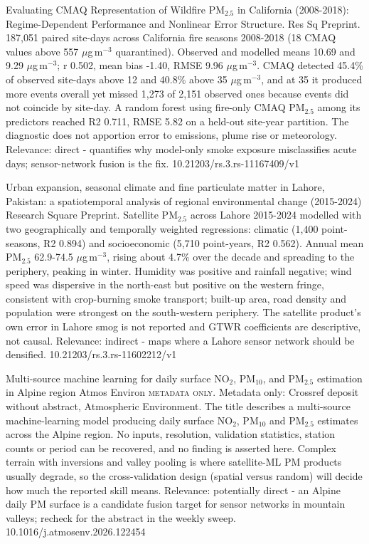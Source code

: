 \documentclass[10pt]{article}
\begin{document}
{Evaluating CMAQ Representation of Wildfire PM$_{2.5}$ in California (2008-2018): Regime-Dependent Performance and Nonlinear Error Structure.}
{Res Sq}
{Preprint. 187,051 paired site-days across California fire seasons 2008-2018 (18 CMAQ values above 557 $\mu$g\,m$^{-3}$ quarantined). Observed and modelled means 10.69 and 9.29 $\mu$g\,m$^{-3}$; r 0.502, mean bias -1.40, RMSE 9.96 $\mu$g\,m$^{-3}$. CMAQ detected 45.4\% of observed site-days above 12 and 40.8\% above 35 $\mu$g\,m$^{-3}$, and at 35 it produced more events overall yet missed 1,273 of 2,151 observed ones because events did not coincide by site-day. A random forest using fire-only CMAQ PM$_{2.5}$ among its predictors reached R2 0.711, RMSE 5.82 on a held-out site-year partition. The diagnostic does not apportion error to emissions, plume rise or meteorology. Relevance: direct - quantifies why model-only smoke exposure misclassifies acute days; sensor-network fusion is the fix.}
{10.21203/rs.3.rs-11167409/v1}

{Urban expansion, seasonal climate and fine particulate matter in Lahore, Pakistan: a spatiotemporal analysis of regional environmental change (2015-2024)}
{Research Square}
{Preprint. Satellite PM$_{2.5}$ across Lahore 2015-2024 modelled with two geographically and temporally weighted regressions: climatic (1,400 point-seasons, R2 0.894) and socioeconomic (5,710 point-years, R2 0.562). Annual mean PM$_{2.5}$ 62.9-74.5 $\mu$g\,m$^{-3}$, rising about 4.7\% over the decade and spreading to the periphery, peaking in winter. Humidity was positive and rainfall negative; wind speed was dispersive in the north-east but positive on the western fringe, consistent with crop-burning smoke transport; built-up area, road density and population were strongest on the south-western periphery. The satellite product's own error in Lahore smog is not reported and GTWR coefficients are descriptive, not causal. Relevance: indirect - maps where a Lahore sensor network should be densified.}
{10.21203/rs.3.rs-11602212/v1}

{Multi-source machine learning for daily surface NO$_2$, PM$_{10}$, and PM$_{2.5}$ estimation in Alpine region}
{Atmos Environ}
{\textsc{metadata only.} Metadata only: Crossref deposit without abstract, Atmospheric Environment. The title describes a multi-source machine-learning model producing daily surface NO$_2$, PM$_{10}$ and PM$_{2.5}$ estimates across the Alpine region. No inputs, resolution, validation statistics, station counts or period can be recovered, and no finding is asserted here. Complex terrain with inversions and valley pooling is where satellite-ML PM products usually degrade, so the cross-validation design (spatial versus random) will decide how much the reported skill means. Relevance: potentially direct - an Alpine daily PM surface is a candidate fusion target for sensor networks in mountain valleys; recheck for the abstract in the weekly sweep.}
{10.1016/j.atmosenv.2026.122454}
\end{document}

